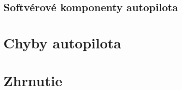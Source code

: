 \documentclass[10pt,twoside,slovak,a4paper]{article}
\begin{document}
\subsection{Softvérové komponenty autopilota}

\section{Chyby autopilota} \label{chyby}
\section{Zhrnutie}


 
\end{document}
